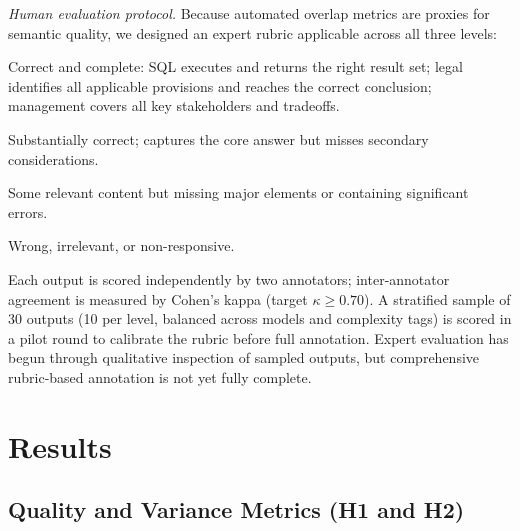 \documentclass[runningheads]{llncs}
\begin{document}
\vspace{5pt}
\noindent
\textit{Human evaluation protocol.}
Because automated overlap metrics are proxies for semantic quality, we designed an expert rubric applicable across all three levels:

\begin{description}[noitemsep]
  \item[3 (Excellent):] Correct and complete: SQL executes and returns the right result set; legal identifies all applicable provisions and reaches the correct conclusion; management covers all key stakeholders and tradeoffs.
  \item[2 (Adequate):] Substantially correct; captures the core answer but misses secondary considerations.
  \item[1 (Partial):] Some relevant content but missing major elements or containing significant errors.
  \item[0 (Incorrect):] Wrong, irrelevant, or non-responsive.
\end{description}

\noindent Each output is scored independently by two annotators; inter-annotator agreement is measured by Cohen's kappa (target $\kappa \geq 0.70$). A stratified sample of 30 outputs (10 per level, balanced across models and complexity tags) is scored in a pilot round to calibrate the rubric before full annotation. Expert evaluation has begun through qualitative inspection of sampled outputs, but comprehensive rubric-based annotation is not yet fully complete.

\section{Results}
\label{sec:results}

\subsection{Quality and Variance Metrics (H1 and H2)}
\label{sec:quality}
\end{document}
